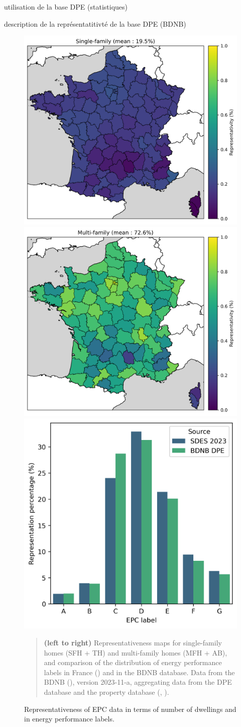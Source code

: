 \documentclass[11pt]{article}
\begin{document}
    utilisation de la base DPE (statistiques)

    description de la représentatitivté de la base DPE (BDNB)

    \begin{figure}[ht]
        \centering
        \includegraphics[width=0.32\columnwidth]{figures/carte_repr_maison_dpe_nblog-BDNB.png}
        \includegraphics[width=0.32\columnwidth]{figures/carte_repr_appartement_dpe_nblog-BDNB.png}
        \includegraphics[width=0.32\columnwidth]{figures/DPE_distribution_dpe_france.png}
        \caption{\label{fig:epc} Representativeness of EPC data in terms of number of dwellings and in energy performance labels.}
        \begin{quote}
            \vspace{-2mm}
            \small\noindent
            \textbf{(left to right)} Representativeness maps for single-family homes (SFH + TH) and multi-family homes (MFH + AB), and comparison of the distribution of energy performance labels in France (\cite{onre_parc_2022}) and in the BDNB database. Data from the BDNB (\cite{cstb_base_2024}), version 2023-11-a, aggregating data from the DPE database and the property database (\cite{ademe_donnees_2024}, \cite{cerema_documentation_2024}). 
        \end{quote}
    \end{figure}
\end{document}

